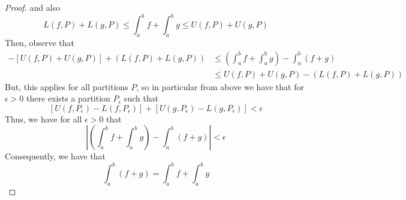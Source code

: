 \documentclass[12pt, a4paper, oneside, openright, titlepage]{book}
\begin{document}
\begin{proof}
    and also \begin{equation*}
        L(f,P) + L(g,P) \leq \int_a^bf + \int_a^bg \leq U(f,P) + U(g,P)
    \end{equation*}
    Then, observe that \begin{align*}
        -[U(f,P) + U(g,P)] + (L(f,P) +L(g,P)) &\leq \left(\int_a^bf+\int_a^bg\right) - \int_a^b(f+g)\\
        &\leq U(f,P) + U(g,P) - (L(f,P) +L(g,P))
    \end{align*}
    But, this applies for all partitions $P$, so in particular from above we have that for $\epsilon > 0$ there exists a partition $P_{\epsilon}$ such that $$[U(f,P_{\epsilon}) - L(f,P_{\epsilon})] + [U(g,P_{\epsilon}) - L(g,P_{\epsilon})] < \epsilon$$
    Thus, we have for all $\epsilon > 0$ that \begin{equation*}
        \left|\left(\int_a^bf+\int_a^bg\right) - \int_a^b(f+g)\right| < \epsilon
    \end{equation*}
    Consequently, we have that \begin{equation*}
        \int_a^b(f+g) = \int_a^bf + \int_a^bg
    \end{equation*}
\end{proof}
\end{document}
